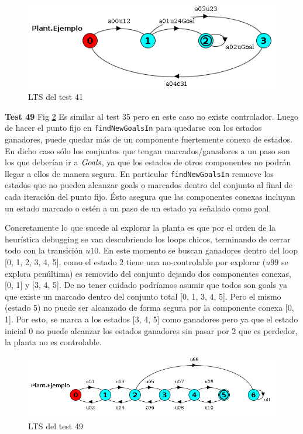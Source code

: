 \begin{figure}[h]
 \centering
 \includegraphics[scale=0.7]{figures/tests/test41.png}
 \caption{LTS del test 41}
 \label{fig:test41}
\end{figure}


\FloatBarrier
\textbf{Test 49} Fig \ref{fig:test49}
Es similar al test 35 pero en este caso no existe controlador. Luego de hacer el punto fijo en \texttt{findNewGoalsIn} para quedarse con los estados ganadores, puede quedar más de un componente fuertemente conexo de estados. En dicho caso sólo los conjuntos que tengan marcados/ganadores a un paso son los que deberían ir a $\mathit{Goals}$, ya que los estados de otros componentes no podrán llegar a ellos de manera segura. En particular \texttt{findNewGoalsIn} remueve los estados que no pueden alcanzar goals o marcados dentro del conjunto al final de cada iteración del punto fijo. Ésto asegura que las componentes conexas incluyan un estado marcado o estén a un paso de un estado ya señalado como goal.

Concretamente lo que sucede al explorar la planta es que por el orden de la heurística debugging se van descubriendo los loops chicos, terminando de cerrar todo con la transición $u10$. En este momento se buscan ganadores dentro del loop [0, 1, 2, 3, 4, 5], como el estado 2 tiene una no-controlable por explorar ($u99$ se explora penúltima) es removido del conjunto dejando dos componentes conexas, [0, 1] y [3, 4, 5]. De no tener cuidado podríamos asumir que todos son goals ya que existe un marcado dentro del conjunto total [0, 1, 3, 4, 5]. Pero el mismo (estado 5) no puede ser alcanzado de forma segura por la componente conexa [0, 1]. Por esto, se marca a los estados [3, 4, 5] como ganadores pero ya que el estado inicial 0 no puede alcanzar los estados ganadores sin pasar por 2 que es perdedor, la planta no es controlable.
\begin{figure}[h]
 \centering
 \includegraphics[scale=0.7]{figures/tests/test49.png}
 \caption{LTS del test 49}
 \label{fig:test49}
\end{figure}
